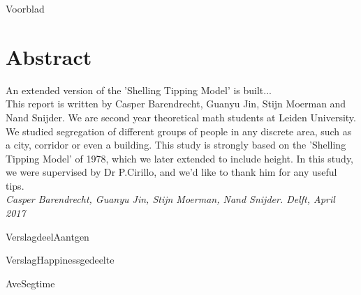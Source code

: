 \documentclass{article}
\begin{document}
{Voorblad}
\newpage

\section*{Abstract}
An extended version of the 'Shelling Tipping Model' is built...\\
This report is written by Casper Barendrecht, Guanyu Jin, Stijn Moerman and Nand Snijder. We are second year theoretical math students at Leiden University. We studied segregation of different groups of people in any discrete area, such as a city, corridor or even a building. This study is strongly based on the 'Shelling Tipping Model' of 1978, which we later extended to include height. In this study, we were supervised by Dr P.Cirillo, and we'd like to thank him for any useful tips.\\
\textit{Casper Barendrecht, Guanyu Jin, Stijn Moerman, Nand Snijder. Delft, April 2017}
\newpage

\tableofcontents
\newpage


\newpage


\newpage

{VerslagdeelAantgen}
\newpage

{VerslagHappinessgedeelte}
\newpage

{AveSegtime}
\newpage
\end{document}
